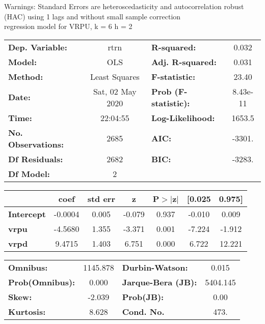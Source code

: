 Warnings: \newline
 [1] Standard Errors are heteroscedasticity and autocorrelation robust (HAC) using 1 lags and without small sample correction\\ 

regression model for VRPU, k = 6 h = 2\begin{center}
\begin{tabular}{lclc}
\toprule
\textbf{Dep. Variable:}    &       rtrn       & \textbf{  R-squared:         } &     0.032   \\
\textbf{Model:}            &       OLS        & \textbf{  Adj. R-squared:    } &     0.031   \\
\textbf{Method:}           &  Least Squares   & \textbf{  F-statistic:       } &     23.40   \\
\textbf{Date:}             & Sat, 02 May 2020 & \textbf{  Prob (F-statistic):} &  8.43e-11   \\
\textbf{Time:}             &     22:04:55     & \textbf{  Log-Likelihood:    } &    1653.5   \\
\textbf{No. Observations:} &        2685      & \textbf{  AIC:               } &    -3301.   \\
\textbf{Df Residuals:}     &        2682      & \textbf{  BIC:               } &    -3283.   \\
\textbf{Df Model:}         &           2      & \textbf{                     } &             \\
\bottomrule
\end{tabular}
\begin{tabular}{lcccccc}
                   & \textbf{coef} & \textbf{std err} & \textbf{z} & \textbf{P$> |$z$|$} & \textbf{[0.025} & \textbf{0.975]}  \\
\midrule
\textbf{Intercept} &      -0.0004  &        0.005     &    -0.079  &         0.937        &       -0.010    &        0.009     \\
\textbf{vrpu}      &      -4.5680  &        1.355     &    -3.371  &         0.001        &       -7.224    &       -1.912     \\
\textbf{vrpd}      &       9.4715  &        1.403     &     6.751  &         0.000        &        6.722    &       12.221     \\
\bottomrule
\end{tabular}
\begin{tabular}{lclc}
\textbf{Omnibus:}       & 1145.878 & \textbf{  Durbin-Watson:     } &    0.015  \\
\textbf{Prob(Omnibus):} &   0.000  & \textbf{  Jarque-Bera (JB):  } & 5404.145  \\
\textbf{Skew:}          &  -2.039  & \textbf{  Prob(JB):          } &     0.00  \\
\textbf{Kurtosis:}      &   8.628  & \textbf{  Cond. No.          } &     473.  \\
\bottomrule
\end{tabular}
\end{center}

